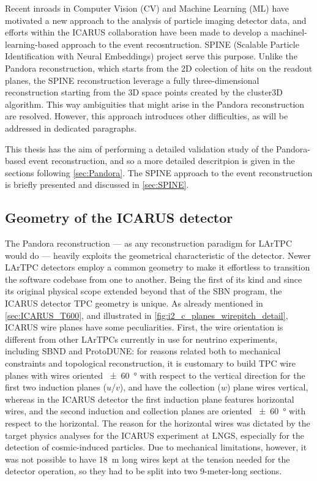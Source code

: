 Recent inroads in Computer Vision (CV) and Machine Learning (ML) have motivated a new approach to the analysis of particle imaging detector data, and efforts within the ICARUS collaboration have been made to develop a machinel-learning-based approach to the event recosntruction. SPINE (Scalable Particle Identification with Neural Embeddings) project serve this purpose. Unlike the Pandora reconstruction, which starts from the 2D colection of hits on the readout planes, the SPINE reconstruction leverage a fully three-dimensional reconstruction starting from the 3D space points created by the cluster3D algorithm. This way ambiguities that might arise in the Pandora reconstruction are resolved. However, this approach introduces other difficulties, as will be addressed in dedicated paragraphs. 

This thesis has the aim of performing a detailed validation study of the Pandora-based event reconstruction, and so a more detailed descritpion is given in the sections following \autoref{sec:Pandora}. The SPINE approach to the event reconstruction is briefly presented and discussed in \autoref{sec:SPINE}.

\subsection{Geometry of the ICARUS detector}

The Pandora reconstruction --- as any reconstruction paradigm for LArTPC would do --- heavily exploits the geometrical characteristic of the detector. Newer LArTPC detectors employ a common geometry to make it effortless to transition the software codebase from one to another. Being the first of its kind and since its original physical scope extended beyond that of the SBN program, the ICARUS detector TPC geometry is unique. As already mentioned in \autoref{sec:ICARUS_T600}, and illustrated in \autoref{fig:i2_c_planes_wirepitch_detail}, ICARUS wire planes have some peculiarities. First, the wire orientation is different from other LArTPCs currently in use for neutrino experiments, including SBND and ProtoDUNE: for reasons related both to mechanical constraints and topological reconstruction, it is customary to build TPC wire planes with wires oriented \SI{+-60}{\degree} with respect to the vertical direction for the first two induction planes ($u$/$v$), and have the collection ($w$) plane wires vertical, whereas in the ICARUS detector the first induction plane features horizontal wires, and the second induction and collection planes are oriented \SI{+-60}{\degree} with respect to the horizontal. The reason for the horizontal wires was dictated by the target physics analyses for the ICARUS experiment at LNGS, especially for the detection of cosmic-induced particles. Due to mechanical limitations, however, it was not possible to have \SI{18}{\metre} long wires kept at the tension needed for the detector operation, so they had to be split into two 9-meter-long sections. 

